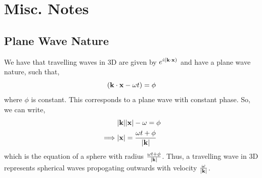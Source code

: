 \documentclass{book}
\begin{document}
\chapter{Misc. Notes}
\section{Plane Wave Nature}
We have that travelling waves in 3D are given by $e^{i(\vb{k}\cdot\vb{x})}$ and have a plane wave nature, such that,
\begin{equation}
	(\vb{k}\cdot\vb{x}-\omega t) = \phi
\end{equation}
where $\phi$ is constant. This corresponds to a plane wave with constant phase. So, we can write,
\begin{equation}
	\begin{split}
		& |\vb{k}||\vb{x}| - \omega = \phi \\
		\implies & |\vb{x}| = \frac{\omega t + \phi}{|\vb{k}|}
	\end{split}
\end{equation}
which is the equation of a sphere with radius $\frac{\omega t + \phi}{|\vb{k}|}$. Thus, a travelling wave in 3D represents spherical waves propogating outwards with velocity $\frac{\omega}{|\vb{k}|}$.
\end{document}

